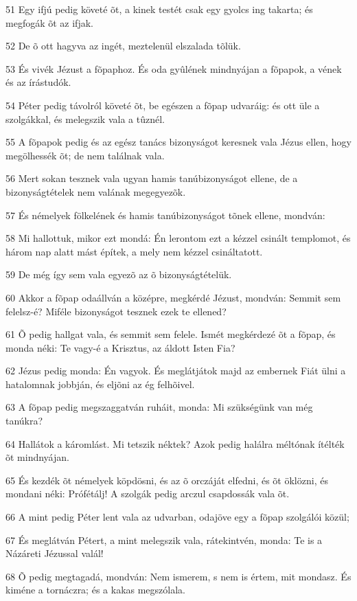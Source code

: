 \par 51 Egy ifjú pedig követé õt, a kinek testét csak egy gyolcs ing takarta; és megfogák õt az ifjak.
\par 52 De õ ott hagyva az ingét, meztelenül elszalada tõlük.
\par 53 És vivék Jézust a fõpaphoz. És oda gyûlének mindnyájan a fõpapok, a vének és az írástudók.
\par 54 Péter pedig távolról követé õt, be egészen a fõpap udvaráig: és ott üle a szolgákkal, és melegszik vala a tûznél.
\par 55 A fõpapok pedig és az egész tanács bizonyságot keresnek vala Jézus ellen, hogy megölhessék õt; de nem találnak vala.
\par 56 Mert sokan tesznek vala ugyan hamis tanúbizonyságot ellene, de a bizonyságtételek nem valának megegyezõk.
\par 57 És némelyek fölkelének és hamis tanúbizonyságot tõnek ellene, mondván:
\par 58 Mi hallottuk, mikor ezt mondá: Én lerontom ezt a kézzel csinált templomot, és három nap alatt mást építek, a mely nem kézzel csináltatott.
\par 59 De még így sem vala egyezõ az õ bizonyságtételük.
\par 60 Akkor a fõpap odaállván a középre, megkérdé Jézust, mondván: Semmit sem felelsz-é? Miféle bizonyságot tesznek ezek te ellened?
\par 61 Õ pedig hallgat vala, és semmit sem felele. Ismét megkérdezé õt a fõpap, és monda néki: Te vagy-é a Krisztus, az áldott Isten Fia?
\par 62 Jézus pedig monda: Én vagyok. És meglátjátok majd az embernek Fiát ülni a hatalomnak jobbján, és eljõni az ég felhõivel.
\par 63 A fõpap pedig megszaggatván ruháit, monda: Mi szükségünk van még tanúkra?
\par 64 Hallátok a káromlást. Mi tetszik néktek? Azok pedig halálra méltónak ítélték õt mindnyájan.
\par 65 És kezdék õt némelyek köpdösni, és az õ orczáját elfedni, és õt öklözni, és mondani néki: Prófétálj! A szolgák pedig arczul csapdossák vala õt.
\par 66 A mint pedig Péter lent vala az udvarban, odajöve egy a fõpap szolgálói közül;
\par 67 És meglátván Pétert, a mint melegszik vala, rátekintvén, monda: Te is a Názáreti Jézussal valál!
\par 68 Õ pedig megtagadá, mondván: Nem ismerem, s nem is értem, mit mondasz. És kiméne a tornáczra; és a kakas megszólala.
